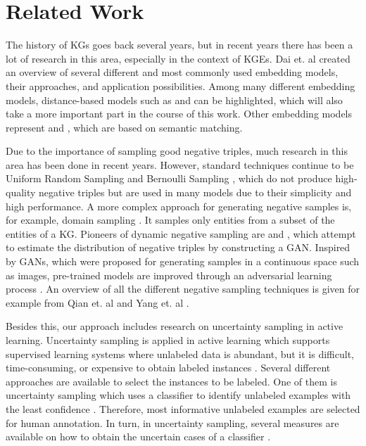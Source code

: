 \section{Related Work} 
\label{sec:relatedwork}

The history of \acp{KG} goes back several years, but in recent years there has been a lot of research in this area, especially in the context of \acp{KGE}.  
Dai et. al \cite{electronics9050750} created an overview of several different and most commonly used embedding models, their approaches, and application possibilities.
Among many different embedding models, distance-based models such as \transe \cite{TransE} and \transd \cite{TransD} can be highlighted, which will also take a more important part in the course of this work.
Other embedding models represent \distmult \cite{DistMult} and \complex \cite{ComplEx}, which are based on semantic matching. 

Due to the importance of sampling good negative triples, much research in this area has been done in recent years.
However, standard techniques continue to be Uniform Random Sampling \cite{TransE} and Bernoulli Sampling \cite{TransH}, which do not produce high-quality negative triples but are used in many models due to their simplicity and high performance.  
A more complex approach for generating negative samples is, for example, domain sampling \cite{domainSampling}.
It samples only entities from a subset of the entities of a \ac{KG}.
Pioneers of dynamic negative sampling are \kbgan \cite{cai2017kbgan} and \igan \cite{IGAN}, which attempt to estimate the distribution of negative triples by constructing a \ac{GAN}.
Inspired by \acp{GAN}, which were proposed for generating samples in a continuous space such as images, pre-trained models are improved through an adversarial learning process \cite{cai2017kbgan}.
An overview of all the different negative sampling techniques is given for example from Qian et. al \cite{qiannegative} and Yang et. al \cite{MCNS}.

Besides this, our approach includes research on uncertainty sampling in active learning.
Uncertainty sampling is applied in active learning which supports supervised learning systems where unlabeled data is abundant, but it is difficult, time-consuming, or expensive to obtain labeled instances \cite{Settles2009ActiveLL}.
Several different approaches are available to select the instances to be labeled.
One of them is uncertainty sampling which uses a classifier to identify unlabeled examples with the least confidence \cite{5272205}.
Therefore, most informative unlabeled examples are selected for human annotation.
In turn, in uncertainty sampling, several measures are available on how to obtain the uncertain cases of a classifier \cite{nguyen2021howtomeasure}.
